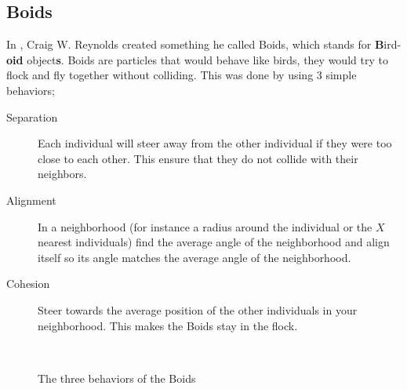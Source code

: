 \subsection{Boids}
In \citep{Reynolds1999}, Craig W. Reynolds created something he called Boids, which stands for \textbf{B}ird-\textbf{oid} object\textbf{s}. Boids are particles that would behave like birds, they would try to flock and fly together without colliding. This was done by using 3 simple behaviors;
\begin{description}
    \item[Separation]
        Each individual will steer away from the other individual if they were too close to each other. This ensure that they do not collide with their neighbors.
    \item[Alignment]
        In a neighborhood (for instance a radius around the individual or the $X$ nearest individuals) find the average angle of the neighborhood and align itself so its angle matches the average angle of the neighborhood.
    \item[Cohesion]
        Steer towards the average position of the other individuals in your neighborhood. This makes the Boids stay in the flock.
\end{description}
\begin{figure}[H]
    \centering
    \hfill
    \unskip\ \vrule\ 
    \hfill
    \unskip\ \vrule\ 
            \caption[Boids behavior]{The three behaviors of the Boids}
            \label{fig:boidbehavior}
\end{figure}

